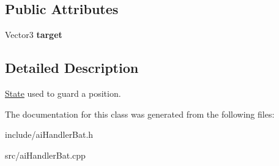 \subsection*{\-Public \-Attributes}
\begin{DoxyCompactItemize}
\item 
\hypertarget{classAIStateBatGuard_af9856430381a76f08f0d955842e9b7e9}{
\-Vector3 {\bfseries target}}
\label{d7/dd6/classAIStateBatGuard_af9856430381a76f08f0d955842e9b7e9}

\end{DoxyCompactItemize}


\subsection{\-Detailed \-Description}
\hyperlink{classState}{\-State} used to guard a position. 

\-The documentation for this class was generated from the following files\-:\begin{DoxyCompactItemize}
\item 
include/ai\-Handler\-Bat.\-h\item 
src/ai\-Handler\-Bat.\-cpp\end{DoxyCompactItemize}
